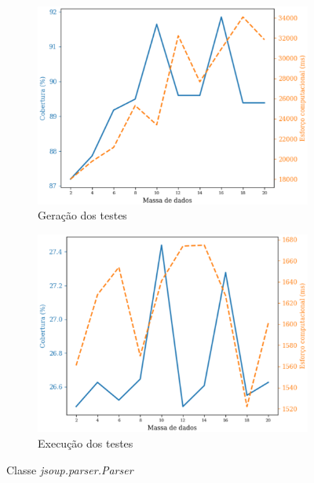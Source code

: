 \begin{figure}[H]
\centering
\begin{subfigure}{.5\textwidth}
    \centering
    \includegraphics[scale=0.5]{figuras/jsoup.parser.parser_generation.eps}
    \caption{Geração dos testes}
    \label{fig:genJsoupParser}
\end{subfigure}%
\begin{subfigure}{.5\textwidth}
    \centering
    \includegraphics[scale=0.5]{figuras/jsoup.parser.parser_execution.eps}
    \caption{Execução dos testes}
    \label{fig:execJsoupParser}
\end{subfigure}
\caption{Classe \textit{jsoup.parser.Parser}}
\label{fig:JsoupParser}
\end{figure}



